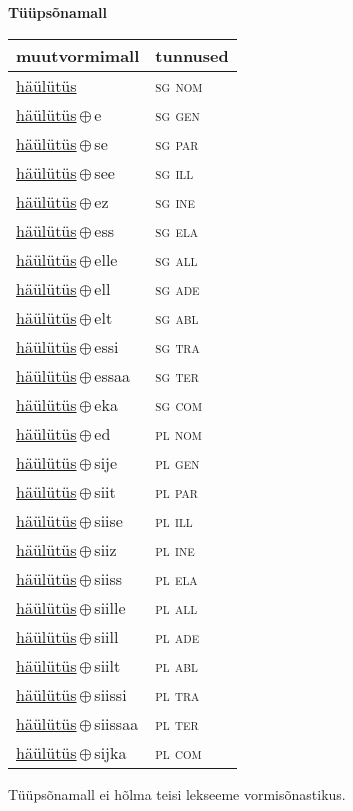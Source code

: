 

\vspace{3.5em}
\noindent \begin{minipage}{\textwidth}
\noindent \textbf{Tüüpsõnamall \,}\\

\begin{sideways}
\begin{tabular}{l l}
muutvormimall & tunnused \\
\hline
\underline{häülütüs} & \textsc{ sg nom } \\
\underline{häülütüs}\,$\oplus$\,e & \textsc{ sg gen } \\
\underline{häülütüs}\,$\oplus$\,se & \textsc{ sg par } \\
\underline{häülütüs}\,$\oplus$\,see & \textsc{ sg ill } \\
\underline{häülütüs}\,$\oplus$\,ez & \textsc{ sg ine } \\
\underline{häülütüs}\,$\oplus$\,ess & \textsc{ sg ela } \\
\underline{häülütüs}\,$\oplus$\,elle & \textsc{ sg all } \\
\underline{häülütüs}\,$\oplus$\,ell & \textsc{ sg ade } \\
\underline{häülütüs}\,$\oplus$\,elt & \textsc{ sg abl } \\
\underline{häülütüs}\,$\oplus$\,essi & \textsc{ sg tra } \\
\underline{häülütüs}\,$\oplus$\,essaa & \textsc{ sg ter } \\
\underline{häülütüs}\,$\oplus$\,eka & \textsc{ sg com } \\
\underline{häülütüs}\,$\oplus$\,ed & \textsc{ pl nom } \\
\underline{häülütüs}\,$\oplus$\,sije & \textsc{ pl gen } \\
\underline{häülütüs}\,$\oplus$\,siit & \textsc{ pl par } \\
\underline{häülütüs}\,$\oplus$\,siise & \textsc{ pl ill } \\
\underline{häülütüs}\,$\oplus$\,siiz & \textsc{ pl ine } \\
\underline{häülütüs}\,$\oplus$\,siiss & \textsc{ pl ela } \\
\underline{häülütüs}\,$\oplus$\,siille & \textsc{ pl all } \\
\underline{häülütüs}\,$\oplus$\,siill & \textsc{ pl ade } \\
\underline{häülütüs}\,$\oplus$\,siilt & \textsc{ pl abl } \\
\underline{häülütüs}\,$\oplus$\,siissi & \textsc{ pl tra } \\
\underline{häülütüs}\,$\oplus$\,siissaa & \textsc{ pl ter } \\
\underline{häülütüs}\,$\oplus$\,sijka & \textsc{ pl com } \\
\end{tabular}
\end{sideways}
\label{tab:tüüpsõnamall-häülütüs}

\end{minipage}

 
\vspace{1em}
\noindent Tüüpsõnamall  ei hõlma teisi lekseeme vormi\-sõnastikus.
